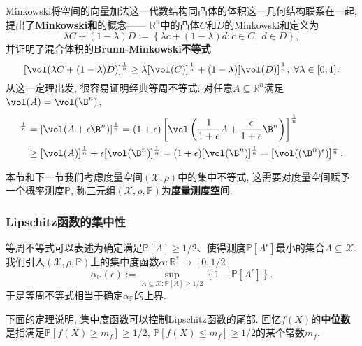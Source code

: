 Minkowski将空间的向量加法这一代数结构同凸体的体积这一几何结构联系在一起, 提出了\textbf{Minkowski和}的概念——
$\mathbb{R}^n$中的凸体$C$和$D$的Minkowski和定义为
\begin{equation*}
	\lambda C + (1 - \lambda) D := \left\{ \lambda c + (1 - \lambda) d \colon c \in C,\; d \in D \right\}, 
\end{equation*}
并证明了混合体积的\textbf{Brunn-Minkowski不等式}
\begin{equation*}
	\left[ \vol(\lambda C + (1-\lambda) D)  \right]^{\frac1n}
	\geq \lambda [\vol(C)]^{\frac1n} + (1-\lambda) [\vol(D)]^{\frac1n},\;
	\forall \lambda \in [0,1]. 
\end{equation*}
从这一定理出发, 很容易证明经典等周不等式: 对任意$A \subseteq \mathbb{R}^n$满足$\vol(A) = \vol(\B^n)$, 
\begin{align*}
	[\vol(A^{\epsilon})]^{\frac1n}
	&= [\vol(A + \epsilon \B^n)]^{\frac1n}
	= (1+\epsilon) \left[\vol\left(\frac{1}{1+\epsilon} A + \frac{\epsilon}{1+\epsilon} \B^n\right)\right]^{\frac1n} \\
	&\geq [\vol(A)]^{\frac1n} + \epsilon [\vol(\B^n)]^{\frac1n} 
	= (1+\epsilon) [\vol(\B^n)]^{\frac1n} 
	= \left[ \vol((\B^n)^{\epsilon}) \right]^{\frac1n}. 
\end{align*}


本节和下一节我们考虑度量空间$(\mathcal{X}, \rho)$中的集中不等式, 这需要对度量空间赋予一个概率测度$\mathbb{P}$, 称三元组$(\mathcal{X}, \rho, \mathbb{P})$为\textbf{度量测度空间}. 

\subsubsection{Lipschitz函数的集中性}

等周不等式可以表述为确定满足$\mathbb{P}[A] \geq 1/2$、使得测度$\mathbb{P}[A^{\epsilon}]$最小的集合$A \subseteq \mathcal{X}$.
我们引入$(\mathcal{X}, \rho, \mathbb{P})$上的集中度函数$\alpha \colon \mathbb{R}^* \to [0, 1/2]$
\begin{equation*}
	\alpha_{\mathbb{P}}(\epsilon)
	:= \sup_{A \subseteq \mathcal{X} \colon \mathbb{P}[A] \geq 1/2} \left\{ 1 - \mathbb{P}[A^{\epsilon}] \right\}. 
\end{equation*}
于是等周不等式相当于确定$\alpha_{\mathbb{P}}$的上界. 

下面的定理说明, 集中度函数可以控制Lipschitz函数的尾部. 
回忆$f(X)$的\textbf{中位数}是指满足$\mathbb{P}[f(X) \geq m_f] \geq 1/2$, $\mathbb{P}[f(X) \leq m_f] \geq 1/2$的某个常数$m_f$. 

